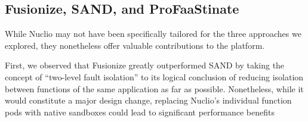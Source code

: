 
\subsection{Fusionize, SAND, and ProFaaStinate}


While Nuclio may not have been specifically tailored for the three approaches we
explored, they nonetheless offer valuable contributions to the platform.

First, we observed that Fusionize greatly outperformed SAND by taking the
concept of \enquote{two-level fault isolation} to its logical conclusion of
reducing isolation between functions of the same application as far as possible.
Nonetheless, while it would constitute a major design change, replacing Nuclio's
individual function pods with native sandboxes could lead to significant
performance benefits

